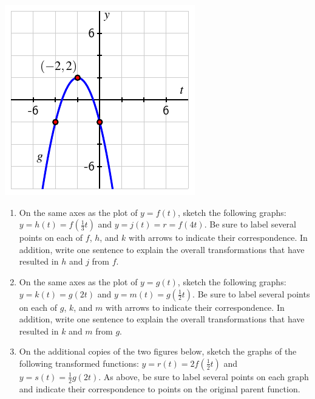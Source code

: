 \documentclass{ximera}
\begin{document}
\begin{exploration}
\begin{image}
\includegraphics[width=1\linewidth]{images/sinusoidal-horiz-scaling-2}
\end{image}
\begin{enumerate}[label=\alph*.]
\item
On the same axes as the plot of \(y = f(t)\), sketch the following graphs:  \(y = h(t) = f(\frac{1}{3}t)\) and \(y = j(t) = r=f(4t)\).  Be sure to label several points on each of \(f\), \(h\), and \(k\) with arrows to indicate their correspondence.  In addition, write one sentence to explain the overall transformations that have resulted in \(h\) and \(j\) from \(f\).%
\item
On the same axes as the plot of \(y = g(t)\), sketch the following graphs:  \(y = k(t) = g(2t)\) and \(y = m(t) = g(\frac{1}{2}t)\).  Be sure to label several points on each of \(g\), \(k\), and \(m\) with arrows to indicate their correspondence.  In addition, write one sentence to explain the overall transformations that have resulted in \(k\) and \(m\) from \(g\).%
\item
On the additional copies of the two figures below, sketch the graphs of the following transformed functions:  \(y = r(t) = 2f(\frac{1}{2}t)\)  and \(y = s(t) = \frac{1}{2}g(2t)\).  As above, be sure to label several points on each graph and indicate their correspondence to points on the original parent function.%

\end{enumerate}
\end{exploration}
\end{document}

